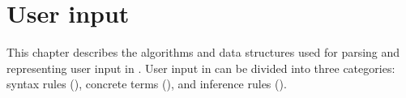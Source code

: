 \chapter{User input}
\label{chapter:input}
This chapter describes the algorithms and data structures used for parsing and representing user input in \projectname{}. User input in \projectname{} can be divided into three categories: syntax rules (), concrete terms (), and inference rules ().


